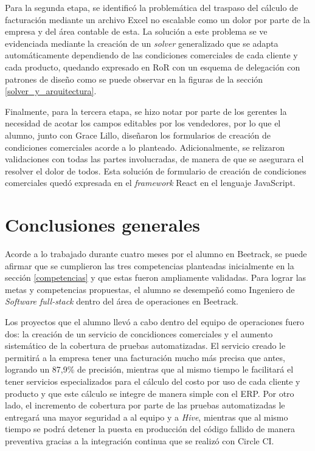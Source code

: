 \begin{enumerate}
    Para la segunda etapa, se identificó la problemática del traspaso del cálculo de facturación mediante un archivo Excel no escalable como un dolor por parte de la empresa y del área contable de esta. La solución a este problema se ve evidenciada mediante la creación de un \textit{solver} generalizado que se adapta automáticamente dependiendo de las condiciones comerciales de cada cliente y cada producto, quedando expresado en RoR con un esquema de delegación con patrones de diseño como se puede observar en la figuras de la sección \ref{solver_y_arquitectura}.

    Finalmente, para la tercera etapa, se hizo notar por parte de los gerentes la necesidad de acotar los campos editables por los vendedores, por lo que el alumno, junto con Grace Lillo, diseñaron los formularios de creación de condiciones comerciales acorde a lo planteado. Adicionalmente, se relizaron validaciones con todas las partes involucradas, de manera de que se asegurara el resolver el dolor de todos. Esta solución de formulario de creación de condiciones comerciales quedó expresada en el \textit{framework} React en el lenguaje JavaScript.

  \end{enumerate}

\section{Conclusiones generales}

  Acorde a lo trabajado durante cuatro meses por el alumno en Beetrack, se puede afirmar que se cumplieron las tres competencias planteadas inicialmente en la sección \ref{competencias} y que estas fueron ampliamente validadas. Para lograr las metas y competencias propuestas, el alumno se desempeñó como Ingeniero de \textit{Software full-stack} dentro del área de operaciones en Beetrack.
  
  Los proyectos que el alumno llevó a cabo dentro del equipo de operaciones fuero dos: la creación de un servicio de concidionces comerciales  y el aumento sistemático de la cobertura de pruebas automatizadas. El servicio creado le permitirá a la empresa tener una facturación mucho más precisa que antes, logrando un 87,9\% de precisión, mientras que al mismo tiempo le facilitará el tener servicios especializados para el cálculo del costo por uso de cada cliente y producto y que este cálculo se integre de manera simple con el ERP. Por otro lado, el incremento de cobertura por parte de las pruebas automatizadas le entregará una mayor seguridad a al equipo y a \textit{Hive}, mientras que al mismo tiempo se podrá detener la puesta en producción del código fallido de manera preventiva gracias a la integración continua que se realizó con Circle CI.

